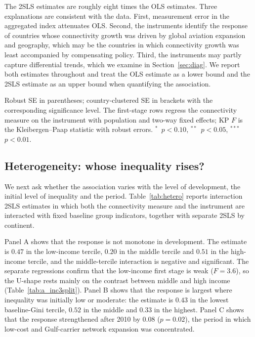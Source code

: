 \documentclass[12pt]{article}
\newcommand{\sym}[1]{\ensuremath{^{#1}}}
\begin{document}
The 2SLS estimates are roughly eight times the OLS estimates. Three explanations are consistent with the data. First, measurement error in the aggregated index attenuates OLS. Second, the instruments identify the response of countries whose connectivity growth was driven by global aviation expansion and geography, which may be the countries in which connectivity growth was least accompanied by compensating policy. Third, the instruments may partly capture differential trends, which we examine in Section~\ref{sec:diag}. We report both estimates throughout and treat the OLS estimate as a lower bound and the 2SLS estimate as an upper bound when quantifying the association.

\begin{table}[H]\centering\caption{Main results: OLS, first stage, and 2SLS, by connectivity measure.}\label{tab:main}
\begin{threeparttable}\small
\begin{tablenotes}\footnotesize\item Robust SE in parentheses; country-clustered SE in brackets with the corresponding significance level. The first-stage rows regress the connectivity measure on the instrument with population and two-way fixed effects; KP $F$ is the Kleibergen--Paap statistic with robust errors. \sym{*}~$p<0.10$, \sym{**}~$p<0.05$, \sym{***}~$p<0.01$.\end{tablenotes}\end{threeparttable}\end{table}

\subsection{Heterogeneity: whose inequality rises?}
\label{sec:hetero}
We next ask whether the association varies with the level of development, the initial level of inequality and the period. Table~\ref{tab:hetero} reports interaction 2SLS estimates in which both the connectivity measure and the instrument are interacted with fixed baseline group indicators, together with separate 2SLS by continent.

Panel A shows that the response is not monotone in development. The estimate is $0.47$ in the low-income tercile, $0.20$ in the middle tercile and $0.51$ in the high-income tercile, and the middle-tercile interaction is negative and significant. The separate regressions confirm that the low-income first stage is weak ($F=3.6$), so the U-shape rests mainly on the contrast between middle and high income (Table~\ref{tab:a_inc3split}). Panel B shows that the response is largest where inequality was initially low or moderate: the estimate is $0.43$ in the lowest baseline-Gini tercile, $0.52$ in the middle and $0.33$ in the highest. Panel C shows that the response strengthened after 2010 by $0.08$ ($p=0.02$), the period in which low-cost and Gulf-carrier network expansion was concentrated.
\end{document}
